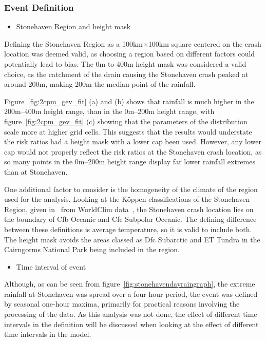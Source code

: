 \subsubsection{Event Definition}

\begin{itemize} \item Stonehaven Region and height mask \end{itemize}

Defining the Stonehaven Region as a 100km$\times$100km square centered on the crash location was deemed valid,
    as choosing a region based on different factors could potentially lead to bias.
The 0m to 400m height mask was considered a valid choice,
    as the catchment of the drain causing the Stonehaven crash peaked at around 200m,
    making 200m the median point of the rainfall.

Figure~\ref{fig:2cpm_gev_fit} (a) and (b) shows that rainfall is much higher in the 200m--400m height range,
    than in the 0m--200m height range,
    with figure~\ref{fig:2cpm_gev_fit} (c) showing that the parameters of the distribution scale more at higher grid cells.
This suggests that the results would understate the risk ratios had a height mask with a lower cap been used.
However, any lower cap would not properly reflect the risk ratios at the Stonehaven crash location,
    as so many points in the 0m--200m height range display far lower rainfall extremes than at Stonehaven.

One additional factor to consider is the homogeneity of the climate of the region used for the analysis.
Looking at the K\"oppen classifications of the Stonehaven Region, given in~\cite{Koppen_file} from WorldClim data~\cite{worldclim},
    the Stonehaven crash location lies on the boundary of Cfb Oceanic and Cfc Subpolar Oceanic.
The defining difference between these definitions is average temperature,
    so it is valid to include both.
The height mask avoids the areas classed as Dfc Subarctic and ET Tundra in the Cairngorms National Park being included in the region.

\begin{itemize}\item Time interval of event\end{itemize}

Although, as can be seen from figure~\ref{fig:stonehavendayraingraph},
    the extreme rainfall at Stonehaven was spread over a four-hour period,
    the event was defined by seasonal one-hour maxima,
    primarily for practical reasons involving the processing of the data.
As this analysis was not done,
    the effect of different time intervals in the definition will be discussed when looking at the effect of
    different time intervals in the model.


